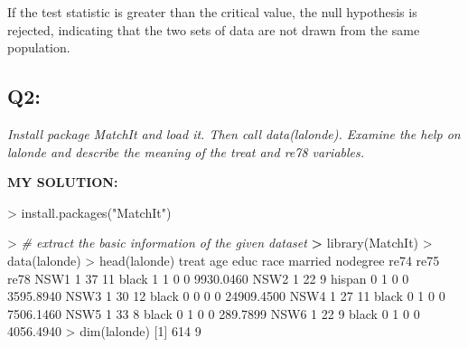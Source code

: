 \documentclass[
]{article}
\newenvironment{Shaded}{\begin{snugshade}}{\end{snugshade}}
\newcommand{\CommentTok}[1]{\textcolor[rgb]{0.56,0.35,0.01}{\textit{#1}}}
\newcommand{\DecValTok}[1]{\textcolor[rgb]{0.00,0.00,0.81}{#1}}
\newcommand{\ErrorTok}[1]{\textcolor[rgb]{0.64,0.00,0.00}{\textbf{#1}}}
\newcommand{\FloatTok}[1]{\textcolor[rgb]{0.00,0.00,0.81}{#1}}
\newcommand{\FunctionTok}[1]{\textcolor[rgb]{0.00,0.00,0.00}{#1}}
\newcommand{\NormalTok}[1]{#1}
\newcommand{\SpecialCharTok}[1]{\textcolor[rgb]{0.00,0.00,0.00}{#1}}
\newcommand{\StringTok}[1]{\textcolor[rgb]{0.31,0.60,0.02}{#1}}
\begin{document}
If the test statistic is greater than the critical value, the null
hypothesis is rejected, indicating that the two sets of data are not
drawn from the same population.

\hypertarget{q2}{%
\subsection{Q2:}\label{q2}}

\emph{Install package MatchIt and load it. Then call data(lalonde).
Examine the help on lalonde and describe the meaning of the treat and
re78 variables.}

\textbf{MY SOLUTION:}

\begin{Shaded}
\begin{Highlighting}[]
\SpecialCharTok{\textgreater{}} \FunctionTok{install.packages}\NormalTok{(}\StringTok{"MatchIt"}\NormalTok{)}
\end{Highlighting}
\end{Shaded}

\begin{Shaded}
\begin{Highlighting}[]
\SpecialCharTok{\textgreater{}} \CommentTok{\# extract the basic information of the given dataset}
\ErrorTok{\textgreater{}} \FunctionTok{library}\NormalTok{(MatchIt)}
\SpecialCharTok{\textgreater{}} \FunctionTok{data}\NormalTok{(lalonde)}
\SpecialCharTok{\textgreater{}} \FunctionTok{head}\NormalTok{(lalonde)}
\NormalTok{     treat age educ   race married nodegree re74 re75       re78}
\NormalTok{NSW1     }\DecValTok{1}  \DecValTok{37}   \DecValTok{11}\NormalTok{  black       }\DecValTok{1}        \DecValTok{1}    \DecValTok{0}    \DecValTok{0}  \FloatTok{9930.0460}
\NormalTok{NSW2     }\DecValTok{1}  \DecValTok{22}    \DecValTok{9}\NormalTok{ hispan       }\DecValTok{0}        \DecValTok{1}    \DecValTok{0}    \DecValTok{0}  \FloatTok{3595.8940}
\NormalTok{NSW3     }\DecValTok{1}  \DecValTok{30}   \DecValTok{12}\NormalTok{  black       }\DecValTok{0}        \DecValTok{0}    \DecValTok{0}    \DecValTok{0} \FloatTok{24909.4500}
\NormalTok{NSW4     }\DecValTok{1}  \DecValTok{27}   \DecValTok{11}\NormalTok{  black       }\DecValTok{0}        \DecValTok{1}    \DecValTok{0}    \DecValTok{0}  \FloatTok{7506.1460}
\NormalTok{NSW5     }\DecValTok{1}  \DecValTok{33}    \DecValTok{8}\NormalTok{  black       }\DecValTok{0}        \DecValTok{1}    \DecValTok{0}    \DecValTok{0}   \FloatTok{289.7899}
\NormalTok{NSW6     }\DecValTok{1}  \DecValTok{22}    \DecValTok{9}\NormalTok{  black       }\DecValTok{0}        \DecValTok{1}    \DecValTok{0}    \DecValTok{0}  \FloatTok{4056.4940}
\SpecialCharTok{\textgreater{}} \FunctionTok{dim}\NormalTok{(lalonde)}
\NormalTok{[}\DecValTok{1}\NormalTok{] }\DecValTok{614}   \DecValTok{9}
\end{Highlighting}
\end{Shaded}
\end{document}
